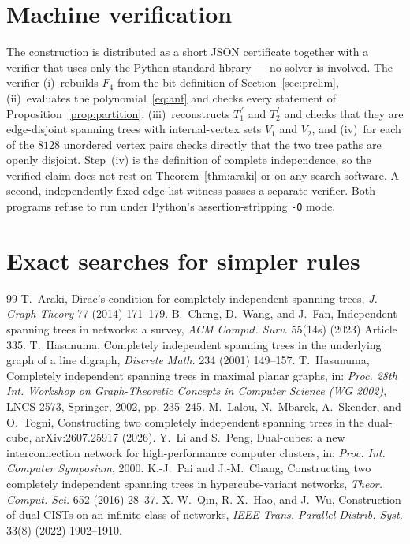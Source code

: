 \documentclass[10pt,a4paper]{amsart}
\begin{document}
\section{Machine verification}\label{sec:verification}

The construction is distributed as a short JSON certificate together with a
verifier that uses only the Python standard library --- no solver is
involved. The verifier (i)~rebuilds $F_4$ from the bit definition of
Section~\ref{sec:prelim}, (ii)~evaluates the polynomial~\eqref{eq:anf} and
checks every statement of Proposition~\ref{prop:partition},
(iii)~reconstructs $T_1^{\,\prime}$ and $T_2^{\,\prime}$ and checks that
they are edge-disjoint spanning trees with internal-vertex sets $V_1$ and
$V_2$, and (iv)~for each of the $8128$ unordered vertex pairs checks
directly that the two tree paths are openly disjoint. Step~(iv) is the
definition of complete independence, so the verified claim does not rest on
Theorem~\ref{thm:araki} or on any search software. A second, independently
fixed edge-list witness passes a separate verifier. Both programs refuse to
run under Python's assertion-stripping \texttt{-O} mode.

\section{Exact searches for simpler rules}\label{sec:searches}


\begin{thebibliography}{99}
 T.~Araki, Dirac's condition for completely independent spanning trees, \emph{J. Graph Theory} 77 (2014) 171--179.
 B.~Cheng, D.~Wang, and J.~Fan, Independent spanning trees in networks: a survey, \emph{ACM Comput. Surv.} 55(14s) (2023) Article 335.
 T.~Hasunuma, Completely independent spanning trees in the underlying graph of a line digraph, \emph{Discrete Math.} 234 (2001) 149--157.
 T.~Hasunuma, Completely independent spanning trees in maximal planar graphs, in: \emph{Proc. 28th Int. Workshop on Graph-Theoretic Concepts in Computer Science (WG 2002)}, LNCS 2573, Springer, 2002, pp. 235--245.
 M.~Lalou, N.~Mbarek, A.~Skender, and O.~Togni, Constructing two completely independent spanning trees in the dual-cube, arXiv:2607.25917 (2026).
 Y.~Li and S.~Peng, Dual-cubes: a new interconnection network for high-performance computer clusters, in: \emph{Proc. Int. Computer Symposium}, 2000.
 K.-J.~Pai and J.-M.~Chang, Constructing two completely independent spanning trees in hypercube-variant networks, \emph{Theor. Comput. Sci.} 652 (2016) 28--37.
 X.-W.~Qin, R.-X.~Hao, and J.~Wu, Construction of dual-CISTs on an infinite class of networks, \emph{IEEE Trans. Parallel Distrib. Syst.} 33(8) (2022) 1902--1910.
\end{thebibliography}
\end{document}
